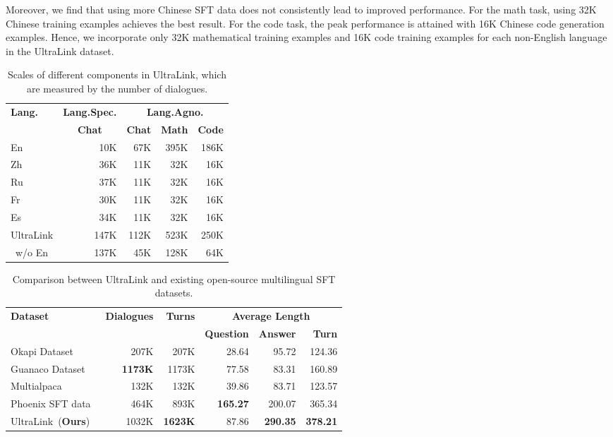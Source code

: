 \documentclass[11pt]{article}
\begin{document}
Moreover, we find that using more Chinese SFT data does not consistently lead to improved performance. For the math task, using 32K Chinese training examples achieves the best result. For the code task, the peak performance is attained with 16K Chinese code generation examples. Hence, we incorporate only 32K mathematical training examples and 16K code training examples for each non-English language in the UltraLink dataset.

\begin{table}[ht]
    \centering
    \small
    \begin{tabular}{l rrrr}
      \toprule
      \multirow{2}{*}{\bf Lang.} & \multicolumn{1}{c}{\bf Lang.Spec.} & \multicolumn{3}{c}{\bf Lang.Agno.} \\
      \cmidrule(lr){2-2} \cmidrule(lr){3-5}
      & \multicolumn{1}{c}{\bf Chat} & \multicolumn{1}{c}{\bf Chat} & \multicolumn{1}{c}{\bf Math} & \multicolumn{1}{c}{\bf Code} \\
      \midrule
      En & 10K & 67K & 395K & 186K \\
      \cmidrule(lr){1-1} \cmidrule(lr){2-5}
      Zh & 36K & 11K & 32K & 16K \\
      Ru & 37K & 11K & 32K & 16K \\
      Fr  & 30K & 11K & 32K & 16K \\
      Es & 34K & 11K & 32K & 16K \\
      \cmidrule(lr){1-1} \cmidrule(lr){2-5}
      UltraLink    & 147K & 112K & 523K & 250K \\
      ~w/o En & 137K & 45K & 128K & 64K \\
      \bottomrule
    \end{tabular}
    \caption{Scales of different components in UltraLink, which are measured by the number of dialogues.}
    \label{tab:datasets_quantity}
\end{table}

\begin{table*}[ht]
\setlength{\tabcolsep}{13.5pt}
\centering
\small
\begin{tabular}{l rrrrr}
  \toprule
  \multirow{2}{*}{\bf Dataset} & \multirow{2}{*}{\bf Dialogues} & \multirow{2}{*}{\bf Turns} & \multicolumn{3}{c}{\bf Average Length} \\
  \cmidrule(lr){4-6}
  & & & \bf Question & \bf Answer & \bf Turn \\
  \midrule
  Okapi Dataset~\cite{okapi} & 207K & 207K & 28.64 & 95.72 & 124.36\\
  Guanaco Dataset~\cite{Guanaco} & \bf 1173K & 1173K & 77.58 & 83.31 & 160.89\\
  Multialpaca~\cite{polylm} & 132K & 132K & 39.86 & 83.71 & 123.57\\
  Phoenix SFT data~\cite{phoenix} & 464K & 893K & \bf 165.27 & 200.07 & 365.34\\
  \midrule
  UltraLink~(\textbf{Ours}) & 1032K & \bf 1623K & 87.86 & \bf 290.35 & \bf 378.21 \\
  \bottomrule
\end{tabular}
\caption{Comparison between UltraLink and existing open-source multilingual SFT datasets.}
\label{tab:datasets_comparison}
\end{table*}
\end{document}
